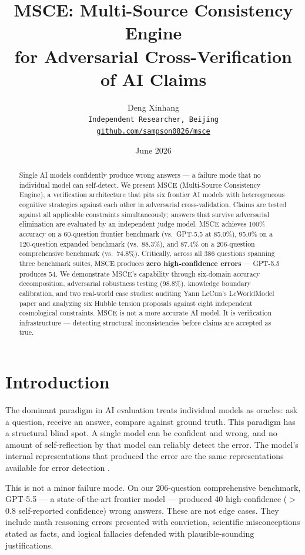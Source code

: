 \documentclass[11pt,a4paper]{article}
\title{\textbf{MSCE: Multi-Source Consistency Engine\\for Adversarial Cross-Verification of AI Claims}}
\author{Deng Xinhang\\
\texttt{Independent Researcher, Beijing}\\
\texttt{\href{https://github.com/sampson0826/msce}{github.com/sampson0826/msce}}}
\date{June 2026}
\begin{document}
\maketitle

\begin{abstract}
Single AI models confidently produce wrong answers — a failure mode that no individual model can self-detect. We present MSCE (Multi-Source Consistency Engine), a verification architecture that pits six frontier AI models with heterogeneous cognitive strategies against each other in adversarial cross-validation. Claims are tested against all applicable constraints simultaneously; answers that survive adversarial elimination are evaluated by an independent judge model. MSCE achieves 100\% accuracy on a 60-question frontier benchmark (vs.\ GPT-5.5 at 85.0\%), 95.0\% on a 120-question expanded benchmark (vs.\ 88.3\%), and 87.4\% on a 206-question comprehensive benchmark (vs.\ 74.8\%). Critically, across all 386 questions spanning three benchmark suites, MSCE produces \textbf{zero high-confidence errors} — GPT-5.5 produces 54. We demonstrate MSCE's capability through six-domain accuracy decomposition, adversarial robustness testing (98.8\%), knowledge boundary calibration, and two real-world case studies: auditing Yann LeCun's LeWorldModel paper and analyzing six Hubble tension proposals against eight independent cosmological constraints. MSCE is not a more accurate AI model. It is verification infrastructure — detecting structural inconsistencies before claims are accepted as true.
\end{abstract}

\section{Introduction}

The dominant paradigm in AI evaluation treats individual models as oracles: ask a question, receive an answer, compare against ground truth. This paradigm has a structural blind spot. A single model can be confident and wrong, and no amount of self-reflection by that model can reliably detect the error. The model's internal representations that produced the error are the same representations available for error detection \cite{turing1950, kahneman2011}.

This is not a minor failure mode. On our 206-question comprehensive benchmark, GPT-5.5 — a state-of-the-art frontier model — produced 40 high-confidence ($>$0.8 self-reported confidence) wrong answers. These are not edge cases. They include math reasoning errors presented with conviction, scientific misconceptions stated as facts, and logical fallacies defended with plausible-sounding justifications.
\end{document}
